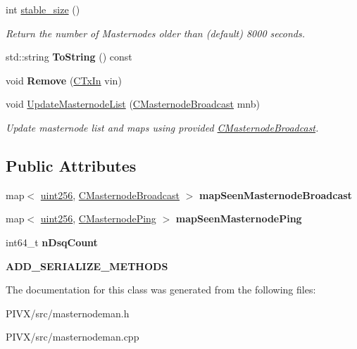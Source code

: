 \begin{DoxyCompactItemize}
int \mbox{\hyperlink{class_c_masternode_man_a35baa3dcb49d2a8e38376747b7b44c59}{stable\+\_\+size}} ()
\begin{DoxyCompactList}\small\item\em Return the number of Masternodes older than (default) 8000 seconds. \end{DoxyCompactList}\item 
\mbox{\label{class_c_masternode_man_a7308c49a95bf9313a71a0b988256cfb4}} 
std\+::string {\bfseries To\+String} () const
\item 
\mbox{\label{class_c_masternode_man_aa36d42c46e914925b9cf0fa34fc712f1}} 
void {\bfseries Remove} (\mbox{\hyperlink{class_c_tx_in}{C\+Tx\+In}} vin)
\item 
\mbox{\label{class_c_masternode_man_aed8b4c3eec39239a4c63c2cda5e7588c}} 
void \mbox{\hyperlink{class_c_masternode_man_aed8b4c3eec39239a4c63c2cda5e7588c}{Update\+Masternode\+List}} (\mbox{\hyperlink{class_c_masternode_broadcast}{C\+Masternode\+Broadcast}} mnb)
\begin{DoxyCompactList}\small\item\em Update masternode list and maps using provided \mbox{\hyperlink{class_c_masternode_broadcast}{C\+Masternode\+Broadcast}}. \end{DoxyCompactList}\end{DoxyCompactItemize}
\subsection*{Public Attributes}
\begin{DoxyCompactItemize}
\item 
\mbox{\label{class_c_masternode_man_a9fe5b66d097008700dc4abb28e9a50d5}} 
map$<$ \mbox{\hyperlink{classuint256}{uint256}}, \mbox{\hyperlink{class_c_masternode_broadcast}{C\+Masternode\+Broadcast}} $>$ {\bfseries map\+Seen\+Masternode\+Broadcast}
\item 
\mbox{\label{class_c_masternode_man_a9efa7ab1dcd28acc3039ae46f4da0361}} 
map$<$ \mbox{\hyperlink{classuint256}{uint256}}, \mbox{\hyperlink{class_c_masternode_ping}{C\+Masternode\+Ping}} $>$ {\bfseries map\+Seen\+Masternode\+Ping}
\item 
\mbox{\label{class_c_masternode_man_a8527c447711c3909cf1bdefec1a7e9be}} 
int64\+\_\+t {\bfseries n\+Dsq\+Count}
\item 
\mbox{\label{class_c_masternode_man_ae39ed8b30469e9fdc42aa09d175e1f78}} 
{\bfseries A\+D\+D\+\_\+\+S\+E\+R\+I\+A\+L\+I\+Z\+E\+\_\+\+M\+E\+T\+H\+O\+DS}
\end{DoxyCompactItemize}


The documentation for this class was generated from the following files\+:\begin{DoxyCompactItemize}
\item 
P\+I\+V\+X/src/masternodeman.\+h\item 
P\+I\+V\+X/src/masternodeman.\+cpp\end{DoxyCompactItemize}
